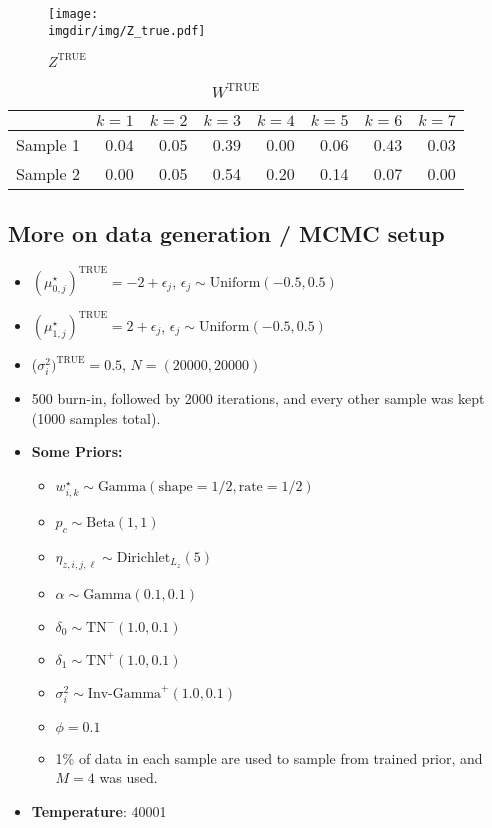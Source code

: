 \documentclass[10pt]{article} %
\newcommand{\Gam}{ \text{Gamma} }
\newcommand{\InvGamma}{ \text{Inv-Gamma} }
\newcommand{\Uniform}{ \text{Uniform} }
\def\Dir{\text{Dirichlet}}
\def\TN{\text{TN}}
\def\true{\text{TRUE}}
\def\imgdir{../../results/test-sim-6-7-7-test/pthin4-batchprop0.01-alpha1.0-N20000}
\begin{document}
\begin{figure}[H]
  \begin{center}  %
    \texttt{[image: \\imgdir/img/Z\_true.pdf]}
  \end{center}
  \caption{$Z^\true$}
  \label{fig:Z-true}
\end{figure}

\begin{table}[ht]
  \centering
  \begin{tabular}{rrrrrrrr}
    \hline
    & $k=1$ & $k=2$ & $k=3$ & $k=4$ & $k=5$ & $k=6$ & $k=7$ \\
    \hline
    Sample 1 & 0.04 & 0.05 & 0.39 & 0.00 & 0.06 & 0.43 & 0.03 \\
    Sample 2 & 0.00 & 0.05 & 0.54 & 0.20 & 0.14 & 0.07 & 0.00 \\
    \hline
  \end{tabular}
  \caption{$W^\true$}
  \label{tab:W-true}
\end{table}

\subsection{More on data generation / MCMC setup}
\begin{itemize}
  \item $(\mu_{0,j}^\star)^\true=-2 + \epsilon_j$, $\epsilon_j \sim \Uniform(-0.5, 0.5)$
  \item $(\mu_{1,j}^\star)^\true=2 + \epsilon_j$, $\epsilon_j \sim \Uniform(-0.5, 0.5)$
  \item ($\sigma^2_i)^\true=0.5$, $N=(20000, 20000)$
  \item 500 burn-in, followed by 2000 iterations, and every other sample was
    kept (1000 samples total).
  \item \textbf{Some Priors:}
  \begin{itemize}
    \item $w^\star_{i,k} \sim \Gam(\text{shape}=1/2, \text{rate}=1/2)$
    \item $p_c \sim \text{Beta}(1, 1)$
    \item $\eta_{z, i,j,\ell} \sim \Dir_{L_z}(5)$
    \item $\alpha \sim \Gam(0.1, 0.1)$
    \item $\delta_0 \sim \TN^-(1.0, 0.1)$
    \item $\delta_1 \sim \TN^+(1.0, 0.1)$
    \item $\sigma^2_i \sim \InvGamma^+(1.0, 0.1)$
    \item $\phi=0.1$
    \item 1\% of data in each sample are used to sample from trained prior, and
      $M=4$ was used.
  \end{itemize}
\item \textbf{Temperature}: 40001
\end{itemize}
\end{document}
